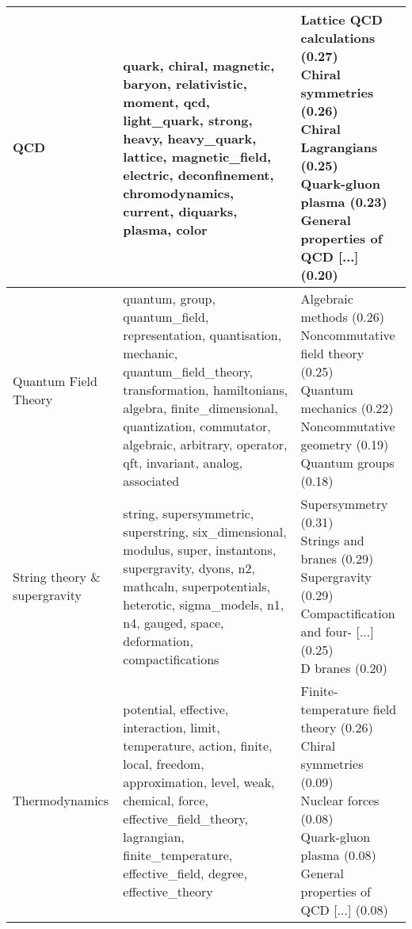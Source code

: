 \begin{longtable}{p{}|b{}|b{}}
                              QCD &                                               quark, chiral, magnetic, baryon, relativistic, moment, qcd, light\_quark, strong, heavy, heavy\_quark, lattice, magnetic\_field, electric, deconfinement, chromodynamics, current, diquarks, plasma, color &                                                                            \shortstack[l]{Lattice QCD calculations (0.27)\\ Chiral symmetries (0.26)\\ Chiral Lagrangians (0.25)\\ Quark-gluon plasma (0.23)\\ General properties of QCD [...] (0.20)}\\ \hline
             Quantum Field Theory & quantum, group, quantum\_field, representation, quantisation, mechanic, quantum\_field\_theory, transformation, hamiltonians, algebra, finite\_dimensional, quantization, commutator, algebraic, arbitrary, operator, qft, invariant, analog, associated &                                                                                      \shortstack[l]{Algebraic methods (0.26)\\ Noncommutative field theory (0.25)\\ Quantum mechanics (0.22)\\ Noncommutative geometry (0.19)\\ Quantum groups (0.18)}\\ \hline
    String theory \& supergravity &                                   string, supersymmetric, superstring, six\_dimensional, modulus, super, instantons, supergravity, dyons, n2, mathcaln, superpotentials, heterotic, sigma\_models, n1, n4, gauged, space, deformation, compactifications &                                                                                                     \shortstack[l]{Supersymmetry (0.31)\\ Strings and branes (0.29)\\ Supergravity (0.29)\\ Compactification and four- [...] (0.25)\\ D branes (0.20)}\\ \hline
                   Thermodynamics &               potential, effective, interaction, limit, temperature, action, finite, local, freedom, approximation, level, weak, chemical, force, effective\_field\_theory, lagrangian, finite\_temperature, effective\_field, degree, effective\_theory &                                                                         \shortstack[l]{Finite-temperature field theory (0.26)\\ Chiral symmetries (0.09)\\ Nuclear forces (0.08)\\ Quark-gluon plasma (0.08)\\ General properties of QCD [...] (0.08)}\\ \hline

\end{longtable}
